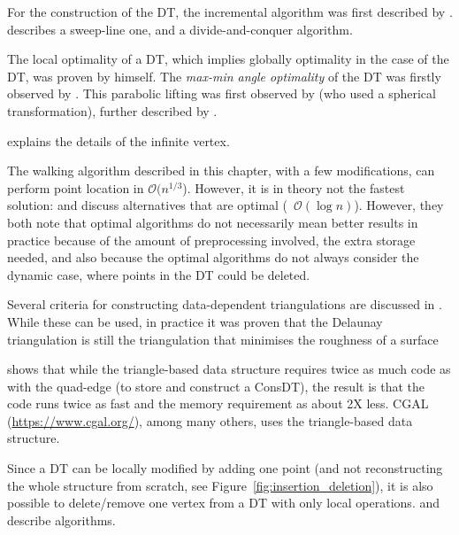 For the construction of the DT, the incremental algorithm was first described by \citet{Lawson72-1}.
\citet{Fortune87} describes a sweep-line one, and \citet{Guibas85} a divide-and-conquer algorithm.

The local optimality of a DT, which implies globally optimality in the case of the DT, was proven by \citet{Delaunay34} himself.
The \emph{max-min angle optimality} of the DT was firstly observed by \citet{Sibson78}.
This parabolic lifting was first observed by \citet{Brown79} (who used a spherical transformation), further described by \citet{Seidel82,Edelsbrunner86}. 

\citet{Liu05-1} explains the details of the infinite vertex.

The walking algorithm described in this chapter, with a few modifications, can perform point location in $\mathcal{O}(n^{1/3}$).
However, it is in theory not the fastest solution: \citet{Mucke99} and \citet{Devillers02} discuss alternatives that are optimal (\ie\ $\mathcal{O}(\log n)$).
However, they both note that optimal algorithms do not necessarily mean better results in practice because of the amount of preprocessing involved, the extra storage needed, and also because the optimal algorithms do not always consider the dynamic case, where points in the DT could be deleted. 

Several criteria for constructing data-dependent triangulations are discussed in \citet{Dyn90}. 
While these can be used, in practice it was proven that the Delaunay triangulation is still the triangulation that minimises the roughness of a surface~\citep{Wang01,Rippa90}


\citet{Shewchuk97} shows that while the triangle-based data structure requires twice as much code as with the quad-edge (to store and construct a ConsDT), the result is that the code runs twice as fast and the memory requirement as about 2X less.
CGAL (\url{https://www.cgal.org/}), among many others, uses the triangle-based data structure.

Since a DT can be locally modified by adding one point (and not reconstructing the whole structure from scratch, see Figure~\ref{fig:insertion_deletion}), it is also possible to delete/remove one vertex from a DT with only local operations.
\citet{Mostafavi03} and \citet{Devillers09} describe algorithms.


